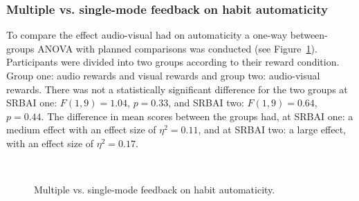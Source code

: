 \documentclass{scaffold/sigchi}
\begin{document}
\subsubsection{Multiple vs. single-mode feedback on habit automaticity}
To compare the effect audio-visual had on automaticity a one-way between-groups ANOVA with planned comparisons was conducted (see Figure~\ref{fig:habit_automaticity_3}). Participants were divided into two groups according to their reward condition. Group one: audio rewards and visual rewards and group two: audio-visual rewards. There was not a
statistically significant difference for the two groups at SRBAI one: $ F(1,9) = 1.04$, $p = 0.33$, and SRBAI two: $F(1,9) = 0.64$, $p = 0.44$. The difference in mean scores between the groups had, at SRBAI one: a medium effect with an effect size of $\eta^{2} = 0.11$, and at SRBAI two: a large effect, with an effect size of $\eta^{2} = 0.17$.


\begin{figure}
  \centering
  \caption{Multiple vs. single-mode feedback on habit automaticity.}~\label{fig:habit_automaticity_3}
\end{figure}
\end{document}
